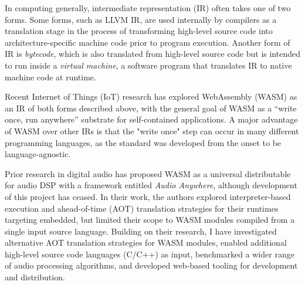 \documentclass[a4paper]{article}
\begin{document}


In computing generally, intermediate representation (IR) often takes one of two forms. Some forms, such as LLVM IR\cite{1281665}, are used internally by compilers as a translation stage in the process of transforming high-level source code into architecture-specific machine code prior to program execution. Another form of IR is \textit{bytecode}, which is also translated from high-level source code but is intended to run inside a \textit{virtual machine}\cite{lindholm2013java}, a software program that translates IR to native machine code at runtime. 

 
 Recent Internet of Things (IoT) research\cite{fi15080275}\cite{10756513}\cite{IOTW753} has explored WebAssembly (WASM) as an IR of both forms described above, with the general goal of WASM as a “write once, run anywhere” substrate for self-contained applications. A major advantage of WASM over other IRs is that the "write once" step can occur in many different programming languages, as the standard was developed from the onset to be language-agnostic\cite{og_wasm}.

 
Prior research in digital audio has proposed WASM as a universal distributable for audio DSP with a framework entitled \textit{Audio Anywhere}\cite{gaster2020audio}, although development of this project has ceased. In their work, the authors explored interpreter-based execution and ahead-of-time (AOT) translation strategies for their runtimes targeting embedded, but limited their scope to WASM modules compiled from a single input source language. Building on their research, I have investigated alternative AOT translation strategies for WASM modules, enabled additional high-level source code languages (C/C++) as input, benchmarked a wider range of audio processing algorithms, and developed web-based tooling for development and distribution.
 
\end{document}
